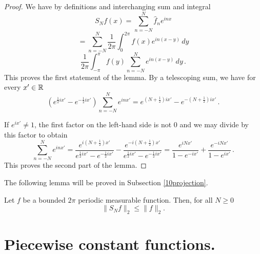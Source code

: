 \begin{proof}
We have by definitions and interchanging sum and integral
    \begin{equation*}
        S_Nf(x)=\sum_{n=-N}^N \widehat{f}_n e^{inx}
    \end{equation*}
        \begin{equation*}
    =\sum_{n=-N}^N \frac 1{2\pi}\int_{0}^{2\pi}
    f(x) e^{in(x-y)}\, dy
    \end{equation*}
    \begin{equation}\label{eq expsum}
        \frac 1{2\pi}\int_{-\pi}^\pi
    f(y) \sum_{n=-N}^N e^{in(x-y)}\, dy\, .
    \end{equation}
This proves the first statement of the lemma.
By a telescoping sum, we have for every $x'\in \mathbb{R}$
\begin{equation}
    \left( e^{\frac 12 ix'}-e^{-\frac 12 ix'}\right)  \sum_{n=-N}^N e^{inx'}= e^{(N+\frac 12) ix'}-e^{-(N+\frac 12) ix'}\, .
\end{equation}

If $e^{ix'}\neq 1$, the first factor on the left-hand side is not $0$ and we may divide by this factor to obtain
\begin{equation}
        \sum_{n=-N}^N e^{inx'}= \frac{e^{i(N+\frac 1 2)x'}}{e^{\frac 12 ix'}-e^{-\frac 12ix'}}
        -\frac{e^{-i(N+\frac 1 2)x'}}{e^{\frac 12 ix'}-e^{-\frac 12ix'}}
        =\frac{e^{iNx'}}{1-e^{-ix'}}
        +\frac {e^{-iNx'}}{1-e^{ix'}}\, .
\end{equation}
This  proves the second part of the lemma.
\end{proof}

The following lemma will be proved in Subsection \ref{10projection}.

\begin{lemma}\label{lem l2sn}
    Let $f$ be a bounded $2\pi$ periodic measurable function. Then, for all $N\ge 0$
    \begin{equation}\label{snbound}
    \|S_Nf\|_2\le \|f\|_2.
    \end{equation}
\end{lemma}





\section{Piecewise constant functions.}
\label{10piecewise}









